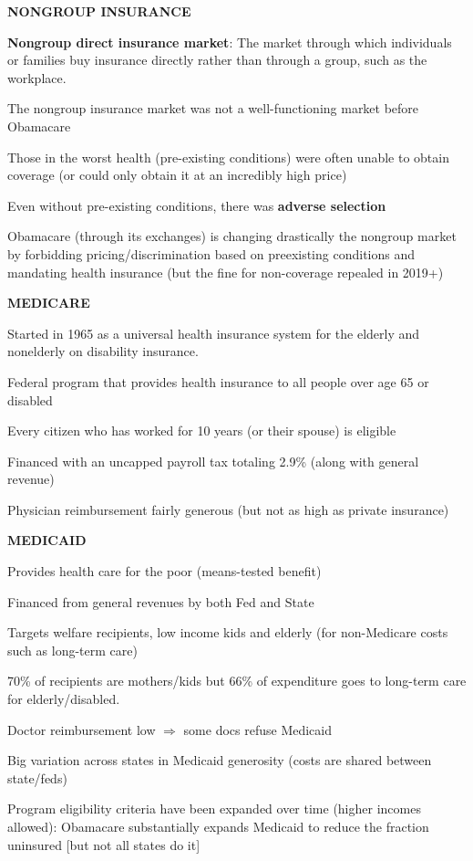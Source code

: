 \documentclass[landscape]{slides}
\begin{document}
\begin{slide}
\begin{center}
{\bf NONGROUP INSURANCE}
\end{center}
{\bf Nongroup direct insurance market}:
The market through which individuals or families buy insurance directly rather than through a group, such as the workplace.

The nongroup insurance market was not a well-functioning market before Obamacare

Those in the worst health (pre-existing conditions) were often unable to obtain coverage (or could only obtain it at an incredibly high price)

Even without pre-existing conditions, there was \textbf{adverse selection}

Obamacare (through its exchanges) is changing drastically the nongroup market by forbidding pricing/discrimination
based on preexisting conditions and mandating health insurance (but the fine for non-coverage repealed in 2019+)
\end{slide}

\begin{slide}
\begin{center}
{\bf MEDICARE}
\end{center}

Started in 1965 as a universal health insurance system for the elderly and nonelderly on disability insurance.

Federal program that provides health insurance to all people over age 65 or disabled

Every citizen who has worked for 10 years (or their spouse) is eligible

Financed with an uncapped payroll tax totaling 2.9\% (along with general revenue)

Physician reimbursement fairly generous (but not as high as private insurance)
\end{slide}

\begin{slide}
\begin{center}
{\bf MEDICAID}
\end{center}
Provides health care for the poor (means-tested benefit) 

Financed from general revenues by both Fed and State 

Targets welfare recipients, low income kids and elderly (for non-Medicare costs such as long-term care)

70\% of recipients are mothers/kids but 66\% of expenditure goes to long-term care for elderly/disabled.

Doctor reimbursement low $\Rightarrow$ some docs refuse Medicaid 

Big variation across states in Medicaid generosity (costs are shared between state/feds)

Program eligibility criteria have been expanded over time (higher incomes allowed): 
Obamacare substantially expands Medicaid to reduce the fraction uninsured [but not all states do it]
\end{slide}
\end{document}
